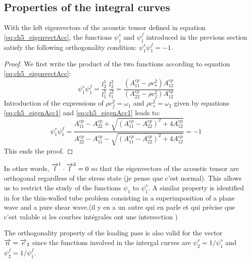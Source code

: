 \subsection{Properties of the integral curves}
With the left eigenvectors of the acoustic tensor defined in equation \eqref{eq:ch5_eigenvectAcc}, the functions $\psi^s_1$ and $\psi^f_1$ introduced in the previous section satisfy the following orthogonality condition: $\psi^s_1\psi^f_1=-1$. 

\begin{proof}
  We first write the product of the two functions according to equation \eqref{eq:ch5_eigenvectAcc}:
  \begin{equation*}
    \psi^s_1\psi^f_1 = \frac{l^1_2}{l^1_1}\: \frac{l_2^2}{l^2_1} = \frac{(A_{11}^{ep}-\rho c_s^2)A^{ep}_{12}}{(A_{22}^{ep}-\rho c_f^2)A^{ep}_{12}}
  \end{equation*}
  Introduction of the expressions of $\rho c_f^2 = \omega_1$ and $\rho c_s^2 = \omega_2$ given by equations \eqref{eq:ch5_eigenAcc1} and \eqref{eq:ch5_eigenAcc1} leads to:
  \begin{equation*}
    \psi^s_1\psi^f_1 = \frac{A_{11}^{ep}-A_{22}^{ep}+\sqrt{(A_{11}^{ep}-A_{22}^{ep})^2 + 4A_{12}^{ep}}}{A_{22}^{ep}-A_{11}^{ep}-\sqrt{(A_{11}^{ep}-A_{22}^{ep})^2 + 4A_{12}^{ep}}}=-1
  \end{equation*}
  This ends the proof.
\end{proof}
In other words, ${\overrightarrow{l}}^1 \cdot {\overrightarrow{l}}^2=0$ so that the eigenvectors of the acoustic tensor are orthogonal regardless of the stress state (je pense que c'est normal). This allows us to restrict the study of the functions $\psi_1$ to $\psi^s_1$.
A similar property is identified in \cite{Clifton} for the thin-walled tube problem consisting in a superimposition of a plane wave and a pure shear wave.(il y en a un autre qui en parle et qui précise que c'est valable si les courbes intégrales ont une intersection \cite[p.13]{Ting68})
\begin{remark}
  The orthogonality property of the loading pass is also valid for the vector ${\overrightarrow{n}}={\overrightarrow{e}}_2$ since the functions involved in the intergal curves are $\psi^s_2=1/\psi^s_1$ and $\psi^f_2=1/\psi^f_1$.
\end{remark}



